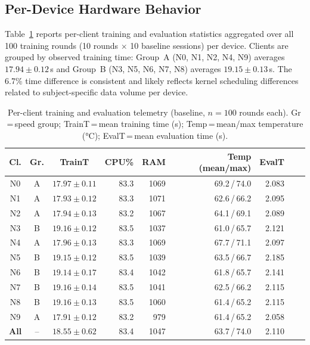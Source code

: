 \documentclass{llncs}
\begin{document}
\subsection{Per-Device Hardware Behavior}
\label{subsec:hw}

Table~\ref{tab:hw} reports per-client training and evaluation
statistics aggregated over all 100 training rounds (10 rounds $\times$
10 baseline sessions) per device. Clients are grouped by observed
training time: Group~A (N0, N1, N2, N4, N9) averages $17.94\pm0.12$\,s
and Group~B (N3, N5, N6, N7, N8) averages $19.15\pm0.13$\,s. The 6.7\%
time difference is consistent and likely reflects kernel scheduling
differences related to subject-specific data volume per device.

\begin{table}[t]
\caption{Per-client training and evaluation telemetry (baseline, $n=100$ rounds each).
  Gr\,=\,speed group; TrainT\,=\,mean training time (s);
  Temp\,=\,mean/max temperature (°C); EvalT\,=\,mean evaluation time (s).}
\label{tab:hw}
\centering\footnotesize
\setlength{\tabcolsep}{3pt}
\begin{tabular}{cccrrrrrr}
\toprule
\textbf{Cl.} & \textbf{Gr.} & \textbf{TrainT} & \textbf{CPU\%}
  & \textbf{RAM} & \textbf{Temp (mean/max)} & \textbf{EvalT} \\
\midrule
N0 & A & $17.97{\pm}0.11$ & 83.3 & 1069 & 69.2\,/\,74.0 & 2.083 \\
N1 & A & $17.93{\pm}0.12$ & 83.3 & 1071 & 62.6\,/\,66.2 & 2.095 \\
N2 & A & $17.94{\pm}0.13$ & 83.2 & 1067 & 64.1\,/\,69.1 & 2.089 \\
N3 & B & $19.16{\pm}0.12$ & 83.5 & 1037 & 61.0\,/\,65.7 & 2.121 \\
N4 & A & $17.96{\pm}0.13$ & 83.3 & 1069 & 67.7\,/\,71.1 & 2.097 \\
N5 & B & $19.15{\pm}0.12$ & 83.5 & 1039 & 63.5\,/\,66.7 & 2.185 \\
N6 & B & $19.14{\pm}0.17$ & 83.4 & 1042 & 61.8\,/\,65.7 & 2.141 \\
N7 & B & $19.16{\pm}0.14$ & 83.5 & 1041 & 62.5\,/\,66.2 & 2.115 \\
N8 & B & $19.16{\pm}0.13$ & 83.5 & 1060 & 61.4\,/\,65.2 & 2.115 \\
N9 & A & $17.91{\pm}0.12$ & 83.2 & \phantom{0}979 & 61.4\,/\,65.2 & 2.058 \\
\midrule
\textbf{All} & -- & $18.55{\pm}0.62$ & 83.4 & 1047 & 63.7\,/\,74.0 & 2.110 \\
\bottomrule
\end{tabular}
\end{table}
\end{document}
